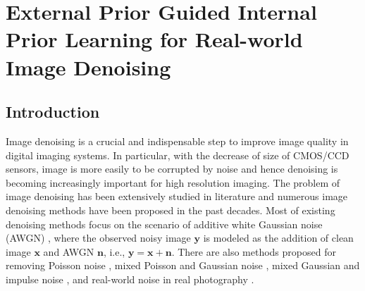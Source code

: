 %
\chapter{External Prior Guided Internal Prior Learning for Real-world Image Denoising}
\label{sec:guided}

\section{Introduction}
\label{sec:system:intro}

Image denoising is a crucial and indispensable step to improve image quality in digital imaging systems. In particular, with the decrease of size of CMOS/CCD sensors, image is more easily to be corrupted by noise and hence denoising is becoming increasingly important for high resolution imaging. The problem of image denoising has been extensively studied in literature and numerous image denoising methods
\cite{bayesshrink,curvelet,ksvd,lssc,ncsr,bm3d,cbm3d,
zhou2012nonparametric,Tomasi1998,blsgsm,nlm,nlbayes,wnnm,pgpd,combexin,external,
tid,foe,epll,
mlp,xie2012image,dncnn,
barbu2009training,csf,tnrd,Fadili,salmon2014,
Foipractical,Luisier,makitalo2013optimal,Montagner,
jiang2014mixed,Hu2016,xuaccv2016,
fullyblind,rabie2005robust,Liu2008,almapg,noiseclinic,
ncwebsite,Zhu_2016_CVPR,crosschannel2016,neatimage}
have been proposed in the past decades. Most of existing denoising methods focus on the scenario of additive white Gaussian noise (AWGN) 
\cite{bayesshrink,curvelet,ksvd,lssc,ncsr,bm3d,cbm3d,
zhou2012nonparametric,Tomasi1998,blsgsm,nlm,nlbayes,wnnm,pgpd,foe,epll,
mlp,xie2012image,dncnn,barbu2009training,csf,tnrd}, where the observed noisy image $\mathbf{y}$ is modeled as the addition of clean image $\mathbf{x}$ and AWGN $\mathbf{n}$, i.e., $\mathbf{y}=\mathbf{x}+\mathbf{n}$. There are also methods proposed for removing Poisson noise \cite{Fadili,salmon2014}, mixed Poisson and Gaussian noise \cite{Foipractical,Luisier,makitalo2013optimal,Montagner}, mixed Gaussian and impulse noise \cite{jiang2014mixed,Hu2016,xuaccv2016}, and real-world noise in real photography \cite{fullyblind,rabie2005robust,Liu2008,almapg,Zhu_2016_CVPR,noiseclinic,
ncwebsite,crosschannel2016,neatimage}.

